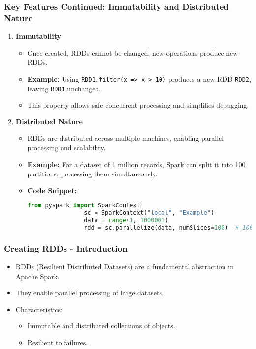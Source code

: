\documentclass[aspectratio=169]{beamer}
\begin{document}
\begin{frame}[fragile]
    \frametitle{Key Features Continued: Immutability and Distributed Nature}
    \begin{enumerate}
        \item \textbf{Immutability}
            \begin{itemize}
                \item Once created, RDDs cannot be changed; new operations produce new RDDs.
                \item \textbf{Example:} Using \texttt{RDD1.filter(x => x > 10)} produces a new RDD \texttt{RDD2}, leaving \texttt{RDD1} unchanged.
                \item This property allows safe concurrent processing and simplifies debugging.
            \end{itemize}
        
        \item \textbf{Distributed Nature}
            \begin{itemize}
                \item RDDs are distributed across multiple machines, enabling parallel processing and scalability.
                \item \textbf{Example:} For a dataset of 1 million records, Spark can split it into 100 partitions, processing them simultaneously.
                \item \textbf{Code Snippet:}
                \begin{lstlisting}[language=Python]
                from pyspark import SparkContext
                sc = SparkContext("local", "Example")
                data = range(1, 1000001)
                rdd = sc.parallelize(data, numSlices=100)  # 100 partitions
                \end{lstlisting}
            \end{itemize}
    \end{enumerate}
\end{frame}

\begin{frame}[fragile]
    \frametitle{Creating RDDs - Introduction}
    \begin{itemize}
        \item RDDs (Resilient Distributed Datasets) are a fundamental abstraction in Apache Spark.
        \item They enable parallel processing of large datasets.
        \item Characteristics:
            \begin{itemize}
                \item Immutable and distributed collections of objects.
                \item Resilient to failures.
            \end{itemize}
    \end{itemize}
\end{frame}
\end{document}
